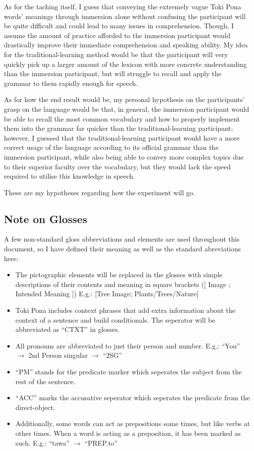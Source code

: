 \documentclass[a4paper,10pt]{article}
\begin{document}
As for the taching itself, I guess that conveying the extremely vague Toki Pona words' meanings
through immersion alone without confusing the participant will be quite difficult and could lead to
many issues in comprehension. Though, I assume the amount of practice afforded to the immersion
participant would drastically improve their immediate comprehension and speaking ability. My idea
for the traditional-learning method would be that the participant will very quickly pick up a
larger amount of the lexicon with more concrete understanding than the immersion participant, but
will struggle to recall and apply the grammar to them rapidly enough for speech.

As for how the end result would be, my personal hypothesis on the participants' grasp on the language
would be that, in general, the immersion participant would be able to recall the most common vocabulary
and how to properly implement them into the grammar far quicker than the traditional-learning
participant; however, I guessed that the traditional-learning participant would have a more correct
usage of the language according to its official grammar than the immersion participant, while also
being able to convey more complex topics due to their superior faculty over the vocabulary, but they
would lack the speed required to utilise this knowledge in speech.

These are my hypotheses regarding how the experiment will go.

\subsection{Note on Glosses}
A few non-standard gloss abbreviations and elements are used
throughout this document, so I have defined their meaning as well as the
standard abreviations here:
\begin{itemize}
 \item The pictographic
 elements will be replaced in the glosses with simple descriptions of their
 contents and meaning in square brackets ([ Image ; Intended Meaning ])
 E.g.: [Tree Image; Plants/Trees/Nature]
 \item Toki Pona includes context phrases that add extra information
 about the context of a sentence and build conditionals. The seperator
 will be abbreviated as ``CTXT'' in glosses.
 \item All pronouns are abbreviated to just their person and number.
 E.g.: ``You'' $\rightarrow$ 2nd Person singular $\rightarrow$ ``2SG''
 \item ``PM'' stands for the predicate marker which seperates the subject
 from the rest of the sentence.
 \item ``ACC'' marks the accusative seperator which seperates the predicate
 from the direct-object.
 \item Additionally, some words can act as prepositions some times, but like
 verbs at other times. When a word is acting as a preposition, it has been
 marked as such. E.g.: ``tawa'' $\rightarrow$ ``PREP.to''
\end{itemize}
\end{document}
